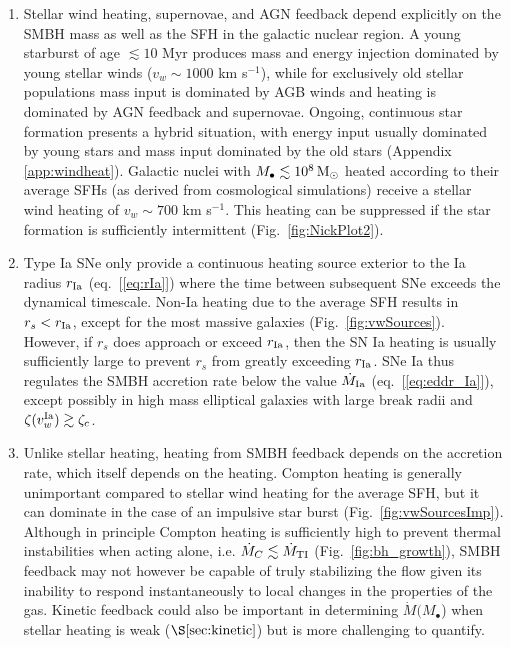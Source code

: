 \documentclass[usenatbib,fleqn]{mn2e}
\newcommand{\rs}{r_s}
\newcommand{\Mbh}[1][]{M_{\bullet#1}}
\newcommand{\rIa}{r_{\rm Ia}}
\begin{document}
\begin{enumerate}
\item Stellar wind heating, supernovae, and AGN feedback depend explicitly on the SMBH mass as well as the SFH in the galactic nuclear region.  A young starburst of age $\lesssim 10$ Myr produces mass and energy injection dominated by young stellar winds ($v_w \sim 1000$ km s$^{-1}$), while for exclusively old stellar populations  mass input is dominated by AGB winds and heating is dominated by AGN feedback and supernovae.  Ongoing, continuous star formation presents a hybrid situation, with energy input usually dominated by young stars and mass input dominated by the old stars (Appendix \ref{app:windheat}).  Galactic nuclei with $\Mbh \lesssim 10^8\Msun$ heated according to their average SFHs (as derived from cosmological simulations) receive a stellar wind heating of $v_w \sim 700$ km s$^{-1}$.  This heating can be suppressed if the star formation is sufficiently intermittent (Fig.~\ref{fig:NickPlot2}).

\item Type Ia SNe only provide a continuous heating source exterior to
  the Ia radius $\rIa$ (eq.~[\ref{eq:rIa}]) where the time between
  subsequent SNe exceeds the dynamical timescale.  Non-Ia heating due
  to the average SFH results in $\rs <\rIa$, except for the most
  massive galaxies (Fig.~\ref{fig:vwSources}).  However, if $\rs$ does
  approach or exceed $\rIa$, then the SN Ia heating is usually
  sufficiently large to prevent $\rs$ from greatly exceeding $\rIa$.
  SNe Ia thus regulates the SMBH accretion rate below the value
  $\dot{M}_{\rm Ia}$ (eq.~[\ref{eq:eddr_Ia}]), except possibly in high
  mass elliptical galaxies with large break radii and $\zeta(v_w^{\rm
    Ia}) \gtrsim \zeta_c$.

\item Unlike stellar heating, heating from SMBH feedback depends on
  the accretion rate, which itself depends on the heating.  Compton heating is generally unimportant compared to stellar
  wind heating for the average SFH, but it can dominate in the case of
  an impulsive star burst (Fig.~\ref{fig:vwSourcesImp}).  Although in
  principle Compton heating is sufficiently high to prevent thermal
  instabilities when acting alone, i.e. $\dot{M}_{C} \lesssim
  \dot{M}_{\rm TI}$ (Fig.~\ref{fig:bh_growth}), SMBH feedback may not
  however be capable of truly stabilizing the flow given its inability
  to respond instantaneously to local changes in the properties of the
  gas.  Kinetic feedback could also be important in determining
  $\dot{M}(M_{\bullet}$) when stellar heating is weak
  ($\S\ref{sec:kinetic}$) but is more challenging to quantify.


\end{enumerate}
\end{document}
